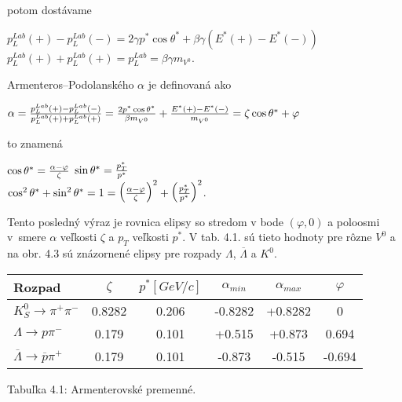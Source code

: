 potom dostávame
\begin{center}
  $p_{L}^{Lab}(+)-p_{L}^{Lab}(-)=2\gamma p^{*}\cos\theta^{*} +\beta\gamma
  (E^{*}(+)-E^{*}(-)) $ \\
  $p_{L}^{Lab}(+)+p_{L}^{Lab}(+)= p_{L}^{Lab}=\beta\gamma m_{{V}^{0}}$.
\end{center}
Armenteros--Podolanského $\alpha$ je definovaná ako
\begin{center}
  $\alpha={\Large\frac{p_{L}^{Lab}(+)-p_{L}^{Lab}(-)}{p_{L}^{Lab}(+)+p_{L}^{Lab}(+)}}
  = {\Large\frac{2p^{*}\cos\theta^{*}}{\beta m_{{V}^{0}}}}+{\Large\frac{E^{*}(+)-E^{*}(-)}
    {m_{{V}^{0}}}} = \zeta\cos\theta^{*} + \varphi$
\end{center}
to znamená
\begin{center}
  $\cos\theta^{*}={\Large\frac{\alpha-\varphi}{\zeta}}$ \hspace{1cm} $\sin\theta^{*}
  = {\Large\frac{p_{T}^{*}}{p^{*}}}$ \\
  $\cos^{2}\theta^{*} + \sin^{2}\theta^{*} =1={\Large \bigl(\frac{\alpha-\varphi}
    {\zeta} \bigr)^{2}} + {\Large\bigl(\frac{p_{T}^{*}}{p^{*}} \bigr)^{2}}$.
\end{center}
Tento posledný výraz je rovnica elipsy so stredom v bode $(\varphi,0)$ a
poloosmi v~smere $\alpha$ veľkosti $\zeta$ a $p_{T}$ veľkosti $p^{*}$. V tab.
4.1. sú tieto hodnoty pre rôzne $V^{0}$ a na obr. 4.3  sú znázornené elipsy
pre rozpady $\Lambda$, $\overline{\Lambda}$ a $K^{0}$.

\vspace*{0.5cm}
\begin{tabular}{|l|c|c|c|c|c|}
  \hline
  Rozpad & $\zeta$ & $p^{*}[GeV/c]$ & $\alpha_{min}$ & $\alpha_{max}$ &
  $\varphi$ \\ \hline
  $K^{0}_{S}\rightarrow\pi^{+}\pi^{-}$ & 0.8282 & 0.206 & -0.8282 & +0.8282 &
  0 \\
  $\Lambda\rightarrow p\pi^{-}$ & 0.179 & 0.101 & +0.515 & +0.873 & 0.694 \\
  $\overline{\Lambda}\rightarrow \overline{p}\pi^{+}$ & 0.179 & 0.101 &
  -0.873 & -0.515 & -0.694 \\ \hline
\end{tabular}
\begin{center}
  Tabuľka 4.1: Armenterovské premenné.
\end{center}
